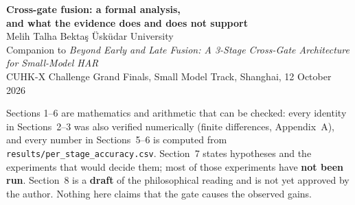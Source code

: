 \documentclass[11pt,a4paper]{article}
\theoremstyle{plain}
\theoremstyle{remark}
\begin{document}
\begin{center}
{\LARGE\bfseries Cross-gate fusion: a formal analysis,\\[2pt] and what the evidence does and does not support}\\[8pt]
Melih Talha Bekta\c{s} \quad\textperiodcentered\quad \"Usk\"udar University\\[2pt]
\small Companion to \emph{Beyond Early and Late Fusion: A 3-Stage Cross-Gate Architecture for Small-Model HAR}\\
\small CUHK-X Challenge Grand Finals, Small Model Track, Shanghai, 12 October 2026
\end{center}
\vspace{4pt}

\begin{status}[title=Status of this document]
Sections 1--6 are mathematics and arithmetic that can be checked: every identity in Sections~2--3 was also verified numerically (finite differences, Appendix~A), and every number in Sections~5--6 is computed from \texttt{results/per\_stage\_accuracy.csv}. Section~7 states hypotheses and the experiments that would decide them; most of those experiments have \textbf{not been run}. Section~8 is a \textbf{draft} of the philosophical reading and is not yet approved by the author. Nothing here claims that the gate causes the observed gains.
\end{status}

\begin{abstract}
\noindent Two video networks, one fed infrared (IR) clips and one fed depth clips, exchange information through a pair of zero-initialised linear maps and are trained in three stages. End to end, averaging the two outputs beat the plain average of two independent models by $+2.2$ points on average over six backbones (4 of 6 positive); training only the gate and heads gave $+0.5$ (2 of 6). We analyse what the architecture can express. At the logit level each branch is a linear classifier on the concatenated features $[f;g]$, so with frozen backbones the gate adds no representational capacity over two concatenation heads; it changes the starting point, the optimisation geometry and the coupling of gradients. Evidence combination is additive in $f$ and $g$, so any interaction between modalities can arise only through feature learning in Stage~3. The data are compatible with a modest effect and with none: the six per-backbone differences have a $t$-statistic of $1.75$ (Stage~3) and $0.32$ (Stage~2). We list the controls that would separate the gate from extra training, head retraining, selection on the validation set and run-to-run noise.
\end{abstract}
\end{document}
